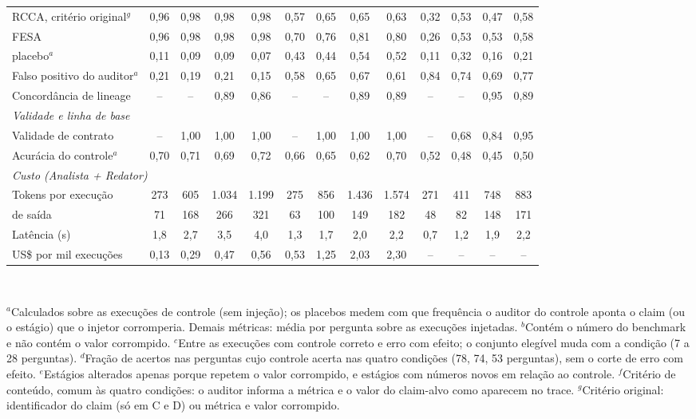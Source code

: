 \begin{table}[t]
\begin{tabular}{|l|cccc|cccc|cccc|}
RCCA, critério original$^{g}$ & 0,96 & 0,98 & 0,98 & 0,98 & 0,57 & 0,65 & 0,65 & 0,63 & 0,32 & 0,53 & 0,47 & 0,58 \\
FESA & 0,96 & 0,98 & 0,98 & 0,98 & 0,70 & 0,76 & 0,81 & 0,80 & 0,26 & 0,53 & 0,53 & 0,58 \\
\quad placebo$^{a}$ & 0,11 & 0,09 & 0,09 & 0,07 & 0,43 & 0,44 & 0,54 & 0,52 & 0,11 & 0,32 & 0,16 & 0,21 \\
Falso positivo do auditor$^{a}$ & 0,21 & 0,19 & 0,21 & 0,15 & 0,58 & 0,65 & 0,67 & 0,61 & 0,84 & 0,74 & 0,69 & 0,77 \\
Concordância de lineage & -- & -- & 0,89 & 0,86 & -- & -- & 0,89 & 0,89 & -- & -- & 0,95 & 0,89 \\
\multicolumn{13}{|l|}{\textit{Validade e linha de base}} \\
Validade de contrato & -- & 1,00 & 1,00 & 1,00 & -- & 1,00 & 1,00 & 1,00 & -- & 0,68 & 0,84 & 0,95 \\
Acurácia do controle$^{a}$ & 0,70 & 0,71 & 0,69 & 0,72 & 0,66 & 0,65 & 0,62 & 0,70 & 0,52 & 0,48 & 0,45 & 0,50 \\
\multicolumn{13}{|l|}{\textit{Custo (Analista + Redator)}} \\
Tokens por execução & 273 & 605 & 1.034 & 1.199 & 275 & 856 & 1.436 & 1.574 & 271 & 411 & 748 & 883 \\
\quad de saída & 71 & 168 & 266 & 321 & 63 & 100 & 149 & 182 & 48 & 82 & 148 & 171 \\
Latência (s) & 1,8 & 2,7 & 3,5 & 4,0 & 1,3 & 1,7 & 2,0 & 2,2 & 0,7 & 1,2 & 1,9 & 2,2 \\
US\$ por mil execuções & 0,13 & 0,29 & 0,47 & 0,56 & 0,53 & 1,25 & 2,03 & 2,30 & -- & -- & -- & -- \\
\hline
\end{tabular}
\\[2pt]{\scriptsize\raggedright $^{a}$Calculados sobre as execuções de controle (sem injeção); os placebos medem com que frequência o auditor do controle aponta o claim (ou o estágio) que o injetor corromperia. Demais métricas: média por pergunta sobre as execuções injetadas. $^{b}$Contém o número do benchmark e não contém o valor corrompido. $^{c}$Entre as execuções com controle correto e erro com efeito; o conjunto elegível muda com a condição (7 a 28 perguntas). $^{d}$Fração de acertos nas perguntas cujo controle acerta nas quatro condições (78, 74, 53 perguntas), sem o corte de erro com efeito. $^{e}$Estágios alterados apenas porque repetem o valor corrompido, e estágios com números novos em relação ao controle. $^{f}$Critério de conteúdo, comum às quatro condições: o auditor informa a métrica e o valor do claim-alvo como aparecem no trace. $^{g}$Critério original: identificador do claim (só em C e D) ou métrica e valor corrompido.\par}
\end{table}
